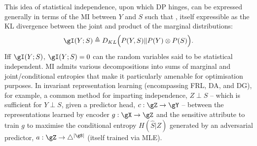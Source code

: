 %
%
This idea of statistical independence, upon which \ac{DP} hinges, can be expressed generally in
terms of the \acf{MI} between \(Y\) and \(S\) such that , itself expressible as the KL divergence
between the joint and product of the marginal distributions:
%
\begin{equation}
    \gI(Y;S) \triangleq D_{KL} \Bigl( P(Y, S) \Vert P(Y) \otimes P(S) \Bigr).
\end{equation}
%
Iff \( \gI(Y;S)\), \( \gI(Y;S) = 0  \) can the random variables said to be statistical independent.
%
\ac{MI} admits various decompositions into sums of marginal and joint/conditional entropies that
make it particularly amenable for optimisation purposes. 
%
In invariant representation learning (encompassing \ac{FRL}, \ac{DA}, and \ac{DG}), for example, a
common method for imparting independence, \(Z \perp S \) -- which is sufficient for \(Y \perp S\),
given a predictor head, \(c: \gZ \to \gY \) -- between the representations learned by encoder \(g:
\gX \to \gZ \) and the sensitive attribute to train \(g\) to maximise the conditional entropy \(
H(\hat{S}|Z) \) generated by an adversarial predictor, \(a: \gZ \to \bigtriangleup^{|\gS|}\)
(itself trained via \ac{MLE}).

